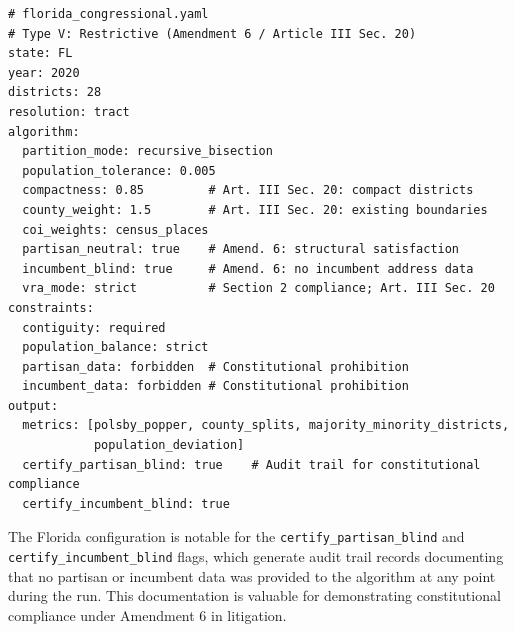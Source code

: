 \begin{verbatim}
# florida_congressional.yaml
# Type V: Restrictive (Amendment 6 / Article III Sec. 20)
state: FL
year: 2020
districts: 28
resolution: tract
algorithm:
  partition_mode: recursive_bisection
  population_tolerance: 0.005
  compactness: 0.85         # Art. III Sec. 20: compact districts
  county_weight: 1.5        # Art. III Sec. 20: existing boundaries
  coi_weights: census_places
  partisan_neutral: true    # Amend. 6: structural satisfaction
  incumbent_blind: true     # Amend. 6: no incumbent address data
  vra_mode: strict          # Section 2 compliance; Art. III Sec. 20
constraints:
  contiguity: required
  population_balance: strict
  partisan_data: forbidden  # Constitutional prohibition
  incumbent_data: forbidden # Constitutional prohibition
output:
  metrics: [polsby_popper, county_splits, majority_minority_districts,
            population_deviation]
  certify_partisan_blind: true    # Audit trail for constitutional compliance
  certify_incumbent_blind: true
\end{verbatim}

The Florida configuration is notable for the \texttt{certify\_partisan\_blind} and \texttt{certify\_incumbent\_blind} flags, which generate audit trail records documenting that no partisan or incumbent data was provided to the algorithm at any point during the run. This documentation is valuable for demonstrating constitutional compliance under Amendment 6 in litigation.
